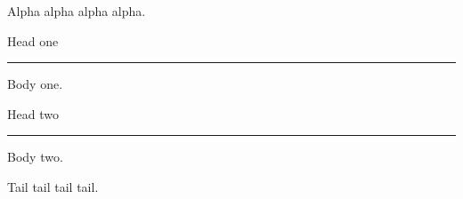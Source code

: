 \documentclass[11pt]{article}
\begin{document}
Alpha alpha alpha alpha.

Head one\\
\rule{\textwidth}{0.6pt}
Body one.

Head two\\
\rule{\textwidth}{0.6pt}
Body two.

Tail tail tail tail.
\end{document}
